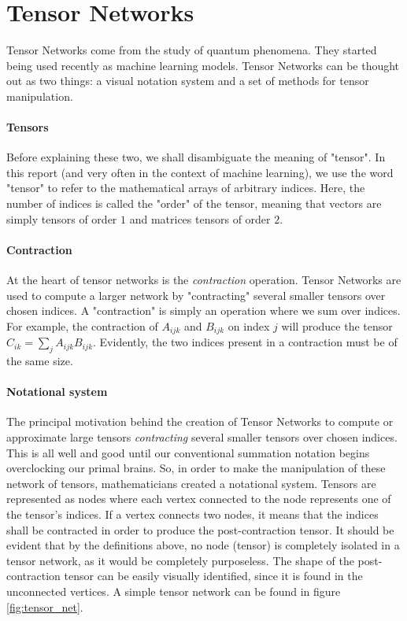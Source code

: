\documentclass[11pt]{article}
\theoremstyle{definition}
\theoremstyle{definition}
\begin{document}
\section{Tensor Networks}
Tensor Networks come from the study of quantum phenomena. They 
started being used recently as machine learning models. Tensor Networks
can be thought out as two things: a visual notation system and a 
set of methods for tensor manipulation. 

\paragraph{Tensors}
Before explaining these two, we shall 
disambiguate the meaning of "tensor". In this report (and very often in the context
of machine learning), we use the word "tensor" to refer to the mathematical arrays
of arbitrary indices. Here, the number of indices is called the "order" of the 
tensor, meaning that vectors are simply tensors of order $1$ and matrices tensors 
of order $2$. 

\paragraph{Contraction}
At the heart of tensor networks is the {\it contraction} operation.
Tensor Networks are used to compute a larger network by "contracting" several
smaller tensors over chosen indices. A "contraction" is simply an operation 
where we sum over indices. For example, the contraction of $A_{ijk}$ and 
$B_{ijk}$ on index $j$ will produce the tensor $C_{ik} = \sum_{j} A_{ijk} B_{ijk}$.
Evidently, the two indices present in a contraction must be of the same size.

\paragraph{Notational system}
The principal motivation behind the creation of Tensor Networks 
to compute or approximate large tensors {\it contracting} several
smaller tensors over chosen indices. This is all well and good until 
our conventional summation notation begins overclocking our primal brains.
So, in order to make the manipulation of these network of tensors, mathematicians
created a notational system. Tensors are represented as nodes where each 
vertex connected to the node represents one of the tensor's indices. 
If a vertex connects two nodes, it means that the indices shall be contracted 
in order to produce the post-contraction tensor. It should be evident that
by the definitions above, no node (tensor) is completely isolated in a tensor network,
as it would be completely purposeless. The shape of the post-contraction tensor 
can be easily visually identified, since it is found in the unconnected vertices.
A simple tensor network can be found in figure \ref{fig:tensor_net}.
\end{document}
